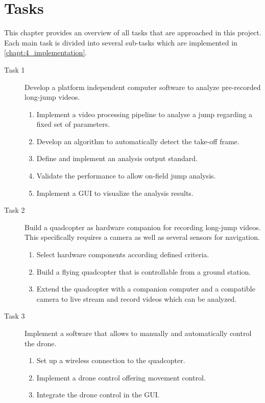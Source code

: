\graphicspath{{./figures/}}
\chapter{Tasks}\label{chapt:2_tasks}
This chapter provides an overview of all tasks that are approached in this
project.
Each main task is divided into several sub-tasks which are implemented in
\autoref{chapt:4_implementation}.

\begin{description}
    \item[Task 1] Develop a platform independent computer software to analyze 
    pre-recorded long-jump videos.
    \begin{enumerate}
        \item Implement a video processing pipeline to analyse a jump regarding 
        a fixed set of parameters.
        \item Develop an algorithm to automatically detect the take-off frame.
        \item Define and implement an analysis output standard.
        \item Validate the performance to allow on-field jump analysis.
        \item Implement a \acs*{GUI} to visualize the analysis results.
    \end{enumerate}
    \item[Task 2] Build a quadcopter as hardware companion for recording 
    long-jump videos. This specifically requires a camera as well as several
    sensors for navigation.
    \begin{enumerate}
        \item Select hardware components according defined criteria.
        \item Build a flying quadcopter that is controllable from a ground
        station.
        \item Extend the quadcopter with a companion computer and a compatible
        camera to live stream and record videos which can be analyzed.
    \end{enumerate}
    \item[Task 3] Implement a software that allows to manually and automatically
    control the drone.
    \begin{enumerate}
        \item Set up a wireless connection to the quadcopter.
        \item Implement a drone control offering movement control.
        \item Integrate the drone control in the \acs*{GUI}.

\end{enumerate}
\end{description}
